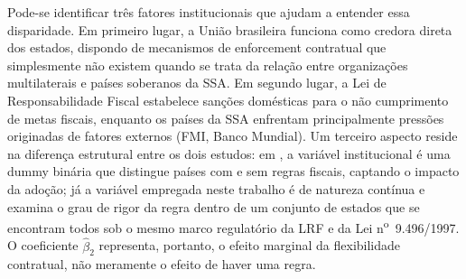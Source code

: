 Pode-se identificar três fatores institucionais que ajudam a entender essa disparidade. Em primeiro lugar, a União brasileira funciona como credora direta dos estados, dispondo de mecanismos de enforcement contratual que simplesmente não existem quando se trata da relação entre organizações multilaterais e países soberanos da SSA. Em segundo lugar, a Lei de Responsabilidade Fiscal estabelece sanções domésticas para o não cumprimento de metas fiscais, enquanto os países da SSA enfrentam principalmente pressões originadas de fatores externos (FMI, Banco Mundial). Um terceiro aspecto reside na diferença estrutural entre os dois estudos: em , a variável institucional é uma dummy binária que distingue países com e sem regras fiscais, captando o impacto da adoção; já a variável empregada neste trabalho é de natureza contínua e examina o grau de rigor da regra dentro de um conjunto de estados que se encontram todos sob o mesmo marco regulatório da LRF e da Lei n\textsuperscript{o}~9.496/1997. O coeficiente $\hat{\beta}_2$ representa, portanto, o efeito marginal da flexibilidade contratual, não meramente o efeito de haver uma regra.
